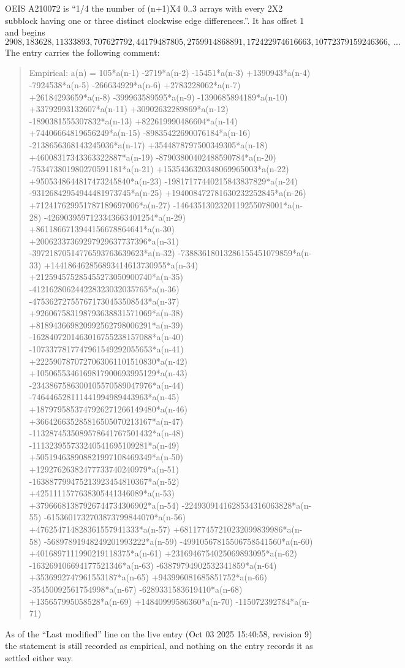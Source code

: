 \documentclass[11pt,a4paper]{article}
\theoremstyle{plain}
\theoremstyle{definition}
\begin{document}
OEIS A210072 is ``1/4 the number of (n+1)X4 0..3 arrays with every 2X2 subblock having one or three distinct clockwise edge differences.''. It has offset $1$ and begins
\[
2908, 183628, 11333893, 707627792, 44179487805, 2759914868891, 172422974616663, 10772379159246366,\ \dots
\]
The entry carries the following comment:
\begin{quote}\small
Empirical: a(n) = 105*a(n-1) -2719*a(n-2) -15451*a(n-3) +1390943*a(n-4) -7924538*a(n-5) -266634929*a(n-6) +2783228062*a(n-7) +26184293659*a(n-8) -399963589595*a(n-9) -1390685894189*a(n-10) +33792993132607*a(n-11) +30902632289869*a(n-12) -1890381555307832*a(n-13) +822619990486604*a(n-14) +74406664819656249*a(n-15) -89835422690076184*a(n-16) -2138656368143245036*a(n-17) +3544878797500349305*a(n-18) +46008317343363322887*a(n-19) -87903800402488590784*a(n-20) -753473801980270591181*a(n-21) +1535436320348069965003*a(n-22) +9505348644817473245840*a(n-23) -19817177440215843837829*a(n-24) -93126842954944481973745*a(n-25) +194008472781630232252845*a(n-26) +712417629951787189697006*a(n-27) -1464351302320119255078001*a(n-28) -4269039597123343663401254*a(n-29) +8611866713944156678864641*a(n-30) +20062337369297929637737396*a(n-31) -39721870514776593763639623*a(n-32) -73883618013286155451079859*a(n-33) +144186462856893414613730955*a(n-34) +212594575285455273050900740*a(n-35) -412162806244228323032035765*a(n-36) -475362727557671730453508543*a(n-37) +926067583198793638831571069*a(n-38) +818943669820992562798006291*a(n-39) -1628407201463016755238157088*a(n-40) -1073377817747961549292055653*a(n-41) +2225907870727063061101510830*a(n-42) +1050655346169817900693995129*a(n-43) -2343867586300105570589047976*a(n-44) -746446528111441994989443963*a(n-45) +1879795853747926271266149480*a(n-46) +366426635285816505070213167*a(n-47) -1132874535089578641767501432*a(n-48) -111323955733240541695109281*a(n-49) +505194638908821997108469349*a(n-50) +12927626382477733740240979*a(n-51) -163887799475213923454810367*a(n-52) +4251111577638305441346089*a(n-53) +37966681387926744734306902*a(n-54) -2249309141628534316063828*a(n-55) -6153601732703873799844070*a(n-56) +476254714828361557941333*a(n-57) +681177457210232099839986*a(n-58) -56897891948249201993222*a(n-59) -49910567815506758541560*a(n-60) +4016897111990219118375*a(n-61) +2316946754025069893095*a(n-62) -163269106694177521346*a(n-63) -63879794902532341859*a(n-64) +3536992747961553187*a(n-65) +943996081685851752*a(n-66) -35450092561754998*a(n-67) -6289331583619410*a(n-68) +135657995058528*a(n-69) +14840999586360*a(n-70) -115072392784*a(n-71)
\end{quote}
As of the ``Last modified'' line on the live entry (Oct 03 2025 15:40:58, revision 9) the statement is
still recorded as empirical, and nothing on the entry records it as settled either way.
\end{document}
